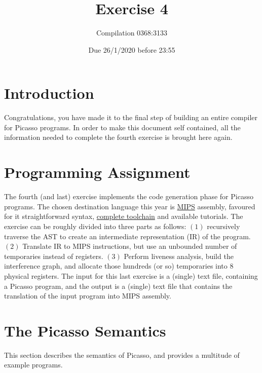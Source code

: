\documentclass{article}
\begin{document}
\title{Exercise 4}

\author{Compilation 0368:3133}

\date{Due 26/1/2020 before 23:55}

\maketitle

\section{Introduction}
Congratulations, you have made it to the final step of
building an entire compiler for Picasso programs.
In order to make this document self contained,
all the information needed to complete the fourth exercise is brought here again.

\section{Programming Assignment}
The fourth (and last) exercise implements the code generation phase for Picasso programs.
The chosen destination language this year is \href{https://en.wikipedia.org/wiki/MIPS_architecture}{MIPS}
assembly, favoured for it straightforward syntax,
\href{https://en.wikipedia.org/wiki/SPIM}{complete toolchain}
and available tutorials.
The exercise can be roughly divided into three parts as follows:
$(1)$ recursively traverse the AST to create
an intermediate representation (IR) of the program.
$(2)$ Translate IR to MIPS instructions,
but use an unbounded number of temporaries instead of registers.
$(3)$ Perform liveness analysis, build the interference graph,
and allocate those hundreds (or so) temporaries into $8$ physical registers.
The input for this last exercise is a (single) text file, containing a Picasso
program, and the output is a (single) text file that contains the translation
of the input program into MIPS assembly.
\section{The Picasso Semantics}
This section describes the semantics of Picasso,
and provides a multitude of example programs.
\newpage
\end{document}
